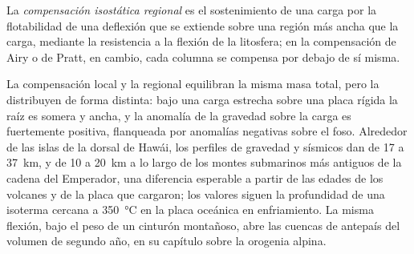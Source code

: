 \begin{definition}\label{def:b3:gravity-geodesy:regional}
La \emph{compensación isostática regional}
es el sostenimiento de una carga por la flotabilidad de una deflexión que se extiende
sobre una región más ancha que la carga, mediante la resistencia a la flexión de la litosfera; en la
compensación de Airy o de Pratt, en cambio, cada columna se compensa por debajo de sí misma.
\end{definition}

La compensación local y la regional equilibran la misma masa total, pero la
distribuyen de forma distinta: bajo una carga estrecha sobre una placa rígida la
raíz es somera y ancha, y la anomalía de la gravedad sobre la carga es fuertemente positiva,
flanqueada por anomalías negativas sobre el foso. Alrededor de las islas de la dorsal de Hawái, los perfiles de gravedad y
sísmicos dan  de 17 a \qty{37}{km}, y
de 10 a \qty{20}{km} a lo largo de los montes submarinos más antiguos de la cadena del Emperador,
una diferencia esperable a partir de las edades de los volcanes y de la placa que cargaron;
los valores siguen la profundidad de una isoterma cercana a
\qty{350}{\degreeCelsius} en la placa oceánica en enfriamiento.
La misma flexión, bajo el peso de un cinturón montañoso, abre las cuencas de
antepaís del volumen de segundo año, en su capítulo sobre la orogenia alpina.

